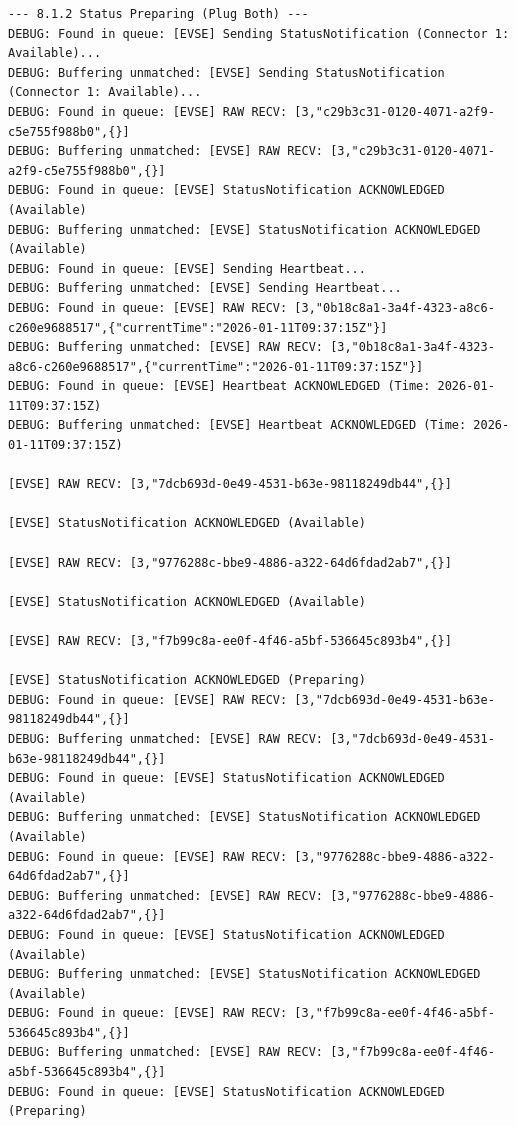 \documentclass{article}
\begin{document}
\begin{lstlisting}
--- 8.1.2 Status Preparing (Plug Both) ---
DEBUG: Found in queue: [EVSE] Sending StatusNotification (Connector 1: Available)...
DEBUG: Buffering unmatched: [EVSE] Sending StatusNotification (Connector 1: Available)...
DEBUG: Found in queue: [EVSE] RAW RECV: [3,"c29b3c31-0120-4071-a2f9-c5e755f988b0",{}]
DEBUG: Buffering unmatched: [EVSE] RAW RECV: [3,"c29b3c31-0120-4071-a2f9-c5e755f988b0",{}]
DEBUG: Found in queue: [EVSE] StatusNotification ACKNOWLEDGED (Available)
DEBUG: Buffering unmatched: [EVSE] StatusNotification ACKNOWLEDGED (Available)
DEBUG: Found in queue: [EVSE] Sending Heartbeat...
DEBUG: Buffering unmatched: [EVSE] Sending Heartbeat...
DEBUG: Found in queue: [EVSE] RAW RECV: [3,"0b18c8a1-3a4f-4323-a8c6-c260e9688517",{"currentTime":"2026-01-11T09:37:15Z"}]
DEBUG: Buffering unmatched: [EVSE] RAW RECV: [3,"0b18c8a1-3a4f-4323-a8c6-c260e9688517",{"currentTime":"2026-01-11T09:37:15Z"}]
DEBUG: Found in queue: [EVSE] Heartbeat ACKNOWLEDGED (Time: 2026-01-11T09:37:15Z)
DEBUG: Buffering unmatched: [EVSE] Heartbeat ACKNOWLEDGED (Time: 2026-01-11T09:37:15Z)

[EVSE] RAW RECV: [3,"7dcb693d-0e49-4531-b63e-98118249db44",{}]

[EVSE] StatusNotification ACKNOWLEDGED (Available)

[EVSE] RAW RECV: [3,"9776288c-bbe9-4886-a322-64d6fdad2ab7",{}]

[EVSE] StatusNotification ACKNOWLEDGED (Available)

[EVSE] RAW RECV: [3,"f7b99c8a-ee0f-4f46-a5bf-536645c893b4",{}]

[EVSE] StatusNotification ACKNOWLEDGED (Preparing)
DEBUG: Found in queue: [EVSE] RAW RECV: [3,"7dcb693d-0e49-4531-b63e-98118249db44",{}]
DEBUG: Buffering unmatched: [EVSE] RAW RECV: [3,"7dcb693d-0e49-4531-b63e-98118249db44",{}]
DEBUG: Found in queue: [EVSE] StatusNotification ACKNOWLEDGED (Available)
DEBUG: Buffering unmatched: [EVSE] StatusNotification ACKNOWLEDGED (Available)
DEBUG: Found in queue: [EVSE] RAW RECV: [3,"9776288c-bbe9-4886-a322-64d6fdad2ab7",{}]
DEBUG: Buffering unmatched: [EVSE] RAW RECV: [3,"9776288c-bbe9-4886-a322-64d6fdad2ab7",{}]
DEBUG: Found in queue: [EVSE] StatusNotification ACKNOWLEDGED (Available)
DEBUG: Buffering unmatched: [EVSE] StatusNotification ACKNOWLEDGED (Available)
DEBUG: Found in queue: [EVSE] RAW RECV: [3,"f7b99c8a-ee0f-4f46-a5bf-536645c893b4",{}]
DEBUG: Buffering unmatched: [EVSE] RAW RECV: [3,"f7b99c8a-ee0f-4f46-a5bf-536645c893b4",{}]
DEBUG: Found in queue: [EVSE] StatusNotification ACKNOWLEDGED (Preparing)


\end{lstlisting}
\end{document}
